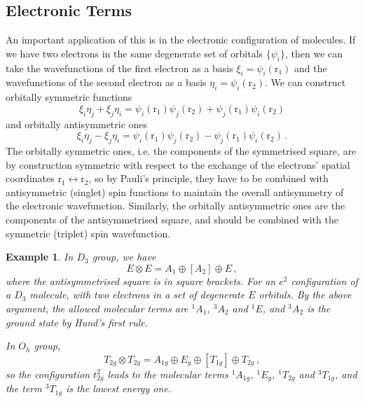\documentclass{article}
\theoremstyle{plain}\theoremheaderfont{\normalfont\itshape}\theorembodyfont{\rmfamily}\theoremseparator{.}\newtheorem*{rem}{Remark}\newtheorem*{ex}{Example}\newtheorem*{proof}{Proof}\newtheorem*{altp}{Alternative proof}
\theoremstyle{plain}\theoremheaderfont{\normalfont\bfseries}\theorembodyfont{\rmfamily}\theoremseparator{.}\newtheorem{thm}{Theorem}[section]\newtheorem{lem}[thm]{Lemma}\newtheorem{prop}[thm]{Proposition}\newtheorem*{cor}{Corollary}\newtheorem{defn}[thm]{Definition}\newtheorem{clm}[thm]{Claim}\newtheorem{clminproof}{Claim}\newtheorem*{law}{Law}\newtheorem{pos}[thm]{Postulate}
\theoremstyle{break}\theoremheaderfont{\normalfont\itshape}\theorembodyfont{\rmfamily}\theoremseparator{.\medskip}\newtheorem*{proofskip}{Proof}\newtheorem*{exs}{Examples}\newtheorem*{rems}{Remarks}
\theoremstyle{break}\theoremheaderfont{\normalfont\bfseries}\theorembodyfont{\rmfamily}\theoremseparator{.\medskip}\newtheorem{lemskip}[thm]{Lemma}\newtheorem{defnskip}[thm]{Definition}\newtheorem{propskip}[thm]{Proposition}\newtheorem{thmskip}[thm]{Theorem}
\numberwithin{equation}{section}
\newcommand{\vb}[1]{\bm{\mathrm{#1}}}
\begin{document}
    \subsection{Electronic Terms}
    An important application of this is in the electronic configuration of molecules. If we have two electrons in the same degenerate set of orbitals \(\{\psi_i\}\), then we can take the wavefunctions of the first electron as a basis \(\xi_i=\psi_i(\vb{r}_1)\) and the wavefunctions of the second electron as a basis \(\eta_i=\psi_i(\vb{r}_2)\). We can construct orbitally symmetric functions
    \begin{equation}
        \xi_i\eta_j+\xi_j\eta_i=\psi_i(\vb{r}_1)\psi_j(\vb{r}_2)+\psi_j(\vb{r}_1)\psi_i(\vb{r}_2)
    \end{equation}
    and orbitally antisymmetric ones
    \begin{equation}
        \xi_i\eta_j-\xi_j\eta_i=\psi_i(\vb{r}_1)\psi_j(\vb{r}_2)-\psi_j(\vb{r}_1)\psi_i(\vb{r}_2)\,.
    \end{equation}
    The orbitally symmetric ones, i.e. the components of the symmetrised square, are by construction symmetric with respect to the exchange of the electrons' spatial coordinates \(\vb{r}_1\leftrightarrow\vb{r}_2\), so by Pauli's principle, they have to be combined with antisymmetric (singlet) spin functions to maintain the overall antisymmetry of the electronic wavefunction. Similarly, the orbitally antisymmetric ones are the components of the antisymmetrised square, and should be combined with the symmetric (triplet) spin wavefunction.

    \begin{ex}
        In \(D_3\) group, we have
        \begin{equation}
            E\otimes E=A_1\oplus[A_2]\oplus E\,,
        \end{equation}
        where the antisymmetrised square is in square brackets. For an \(e^2\) configuration of a \(D_3\) molecule, with two electrons in a set of degenerate \(E\) orbitals. By the above argument, the allowed molecular terms are \(^1A_1\), \(^3A_2\) and \(^1E\), and \(^3A_2\) is the ground state by Hund's first rule.

        In \(O_h\) group,
        \begin{equation}
            T_{2g}\otimes T_{2g}=A_{1g}\oplus E_g\oplus[T_{1g}]\oplus T_{2g}\,,
        \end{equation}
        so the configuration \(t_{2g}^2\) leads to the molecular terms \(^1A_{1g}\), \(^1E_g\), \(^1T_{2g}\) and \(^3T_{1g}\), and the term \(^3T_{1g}\) is the lowest energy one.
    \end{ex}
\end{document}
